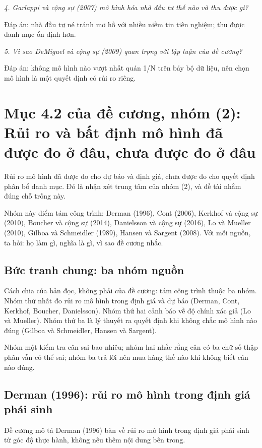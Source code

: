 {\itshape 4. Garlappi và cộng sự (2007) mô hình hóa nhà đầu tư thế nào và thu được gì?\par}

Đáp án: nhà đầu tư né tránh mơ hồ với nhiều niềm tin tiên nghiệm; thu được danh mục ổn định hơn.

{\itshape 5. Vì sao DeMiguel và cộng sự (2009) quan trọng với lập luận của đề cương?\par}

Đáp án: không mô hình nào vượt nhất quán 1/N trên bảy bộ dữ liệu, nên chọn mô hình là một quyết định có rủi ro riêng.

\chapter{Mục 4.2 của đề cương, nhóm (2): Rủi ro và bất định mô hình đã được đo ở đâu, chưa được đo ở đâu}

Rủi ro mô hình đã được đo cho dự báo và định giá, chưa được đo cho quyết định phân bổ danh mục. Đó là nhận xét trung tâm của nhóm (2), và đề tài nhắm đúng chỗ trống này.

Nhóm này điểm tám công trình: Derman (1996), Cont (2006), Kerkhof và cộng sự (2010), Boucher và cộng sự (2014), Danielsson và cộng sự (2016), Lo và Mueller (2010), Gilboa và Schmeidler (1989), Hansen và Sargent (2008). Với mỗi nguồn, ta hỏi: họ làm gì, nghĩa là gì, vì sao đề cương nhắc.

\section{Bức tranh chung: ba nhóm nguồn}

Cách chia của bản đọc, không phải của đề cương: tám công trình thuộc ba nhóm. Nhóm thứ nhất đo rủi ro mô hình trong định giá và dự báo (Derman, Cont, Kerkhof, Boucher, Danielsson). Nhóm thứ hai cảnh báo về độ chính xác giả (Lo và Mueller). Nhóm thứ ba là lý thuyết ra quyết định khi không chắc mô hình nào đúng (Gilboa và Schmeidler, Hansen và Sargent).

Nhóm một kiểm tra cân sai bao nhiêu; nhóm hai nhắc rằng cân có ba chữ số thập phân vẫn có thể sai; nhóm ba trả lời nên mua hàng thế nào khi không biết cân nào đúng.

\section{Derman (1996): rủi ro mô hình trong định giá phái sinh}

Đề cương mô tả Derman (1996) bàn về rủi ro mô hình trong định giá phái sinh từ góc độ thực hành, không nêu thêm nội dung bên trong.

